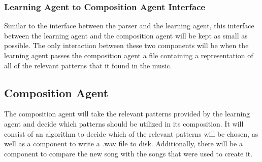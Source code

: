 \documentclass{article}
\begin{document}
\subsubsection{Learning Agent to Composition Agent Interface}
Similar to the interface between the parser and the learning agent, this interface between the learning agent and the composition agent will be kept as small as possible. The only interaction between these two components will be when the learning agent passes the composition agent a file containing a representation of all of the relevant patterns that it found in the music.

\subsection{Composition Agent}
The composition agent will take the relevant patterns provided by the learning agent and decide which patterns should be utilized in its composition. It will consist of an algorithm to decide which of the relevant patterns will be chosen, as well as a component to write a .wav file to disk.  Additionally, there will be a component to compare the new song with the songs that were used to create it.

\nocite{*}





\end{document}
